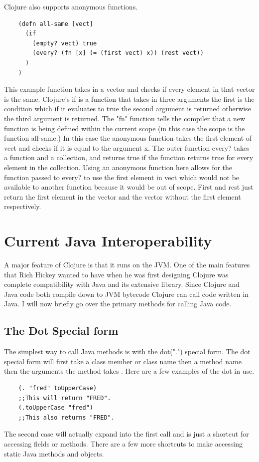\documentclass[12pt]{article}
\begin{document}
	Clojure also supports anonymous functions. 
	\begin{verbatim}
	(defn all-same [vect]
      (if 
        (empty? vect) true
        (every? (fn [x] (= (first vect) x)) (rest vect)) 
      )
    )
	\end{verbatim}
	This example function takes in a vector and checks if every element in that vector is the same. Clojure's if is a function that takes in three arguments the first is the condition which if it evaluates to true the second argument is returned otherwise the third argument is returned. The "fn" function tells the compiler that a new function is being defined within the current scope (in this case the scope is the function all-same.) In this case the anonymous function takes the first element of vect and checks if it is equal to the argument x. The outer function every? takes a function and a collection, and returns true if the function returns true for every element in the collection. Using an anonymous function here allows for the function passed to every? to use the first element in vect which would not be available to another function because it would be out of scope. First and rest just return the first element in the vector and the vector without the first element respectively.

\section{Current Java Interoperability}\label{sec:bg}
	A major feature of Clojure is that it runs on the JVM. One of the main features that Rich Hickey wanted to have when he was first designing Clojure was complete compatibility with Java and its extensive library. Since Clojure and Java code both compile down to JVM bytecode Clojure can call code written in Java. I will now briefly go over the primary methods for calling Java code.
	
	\subsection{The Dot Special form}
	The simplest way to call Java methods is with the dot(".") special form. The dot special form will first take a class member or class name then a method name then the arguments the method takes \cite{cloj:interop}. Here are a few examples of the dot in use.
	\begin{verbatim}
	(. "fred" toUpperCase)
	;;This will return "FRED".
	(.toUpperCase "fred")
	;;This also returns "FRED".
	\end{verbatim}
	The second case will actually expand into the first call and is just a shortcut for accessing fields or methods. There are a few more shortcuts to make accessing static Java methods and objects.
	
\end{document}
